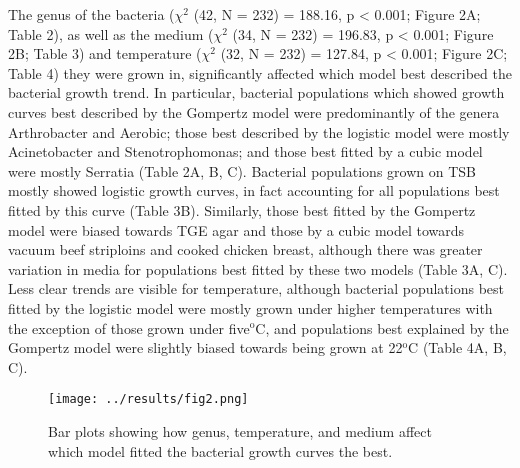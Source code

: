 \documentclass[11pt]{article}
\newcommand{\supersc}[1]{\ensuremath{^{\textrm{#1}}}}
\begin{document}
	The genus of the bacteria ($\chi^2$ (42, N = 232) = 188.16, p < 0.001; Figure 2A; Table 2), as well as the medium ($\chi^2$ (34, N = 232) = 196.83, p < 0.001; Figure 2B; Table 3) and temperature ($\chi^2$ (32, N = 232) = 127.84, p < 0.001; Figure 2C; Table 4) they were grown in, significantly affected which model best described the bacterial growth trend. In particular, bacterial populations which showed growth curves best described by the Gompertz model were predominantly of the genera Arthrobacter and Aerobic; those best described by the logistic model were mostly Acinetobacter and Stenotrophomonas; and those best fitted by a cubic model were mostly Serratia (Table 2A, B, C). Bacterial populations grown on TSB mostly showed logistic growth curves, in fact accounting for all populations best fitted by this curve (Table 3B). Similarly, those best fitted by the Gompertz model were biased towards TGE agar and those by a cubic model towards vacuum beef striploins and cooked chicken breast, although there was greater variation in media for populations best fitted by these two models (Table 3A, C). Less clear trends are visible for temperature, although bacterial populations best fitted by the logistic model were mostly grown under higher temperatures with the exception of those grown under five\supersc{o}C, and populations best explained by the Gompertz model were slightly biased towards being grown at 22\supersc{o}C (Table 4A, B, C).
	
		\begin{figure}[htbp]
		\centering
		\texttt{[image: ../results/fig2.png]}
		\caption{Bar plots showing how genus, temperature, and medium affect which model fitted the bacterial growth curves the best.}
		\label{fig2}
	\end{figure}
\end{document}

